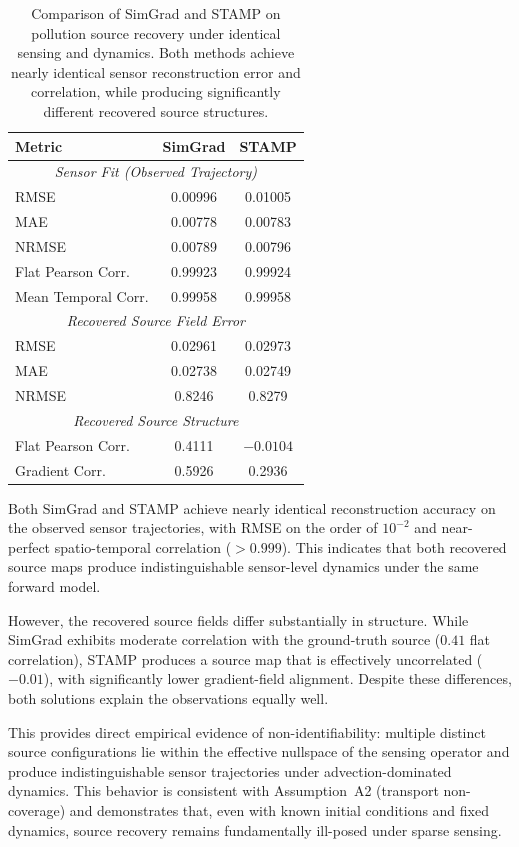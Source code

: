 \begin{table}[t]
\centering
\small
\begin{tabular}{lcc}
\toprule
\textbf{Metric} & \textbf{SimGrad} & \textbf{STAMP} \\
\midrule
\multicolumn{3}{c}{\textit{Sensor Fit (Observed Trajectory)}} \\
RMSE & 0.00996 & 0.01005 \\
MAE  & 0.00778 & 0.00783 \\
NRMSE & 0.00789 & 0.00796 \\
Flat Pearson Corr. & 0.99923 & 0.99924 \\
Mean Temporal Corr. & 0.99958 & 0.99958 \\
\midrule
\multicolumn{3}{c}{\textit{Recovered Source Field Error}} \\
RMSE & 0.02961 & 0.02973 \\
MAE  & 0.02738 & 0.02749 \\
NRMSE & 0.8246 & 0.8279 \\
\midrule
\multicolumn{3}{c}{\textit{Recovered Source Structure}} \\
Flat Pearson Corr. & 0.4111 & $-0.0104$ \\
Gradient Corr. & 0.5926 & 0.2936 \\
\bottomrule
\end{tabular}
\caption{
Comparison of SimGrad and STAMP on pollution source recovery under identical sensing and dynamics. 
Both methods achieve nearly identical sensor reconstruction error and correlation, while producing 
significantly different recovered source structures.
}
\label{tab:pol_non_identifiability}
\end{table}

Both SimGrad and STAMP achieve nearly identical reconstruction accuracy on the observed sensor trajectories, with RMSE on the order of $10^{-2}$ and near-perfect spatio-temporal correlation ($>0.999$). This indicates that both recovered source maps produce indistinguishable sensor-level dynamics under the same forward model.

However, the recovered source fields differ substantially in structure. While SimGrad exhibits moderate correlation with the ground-truth source ($0.41$ flat correlation), STAMP produces a source map that is effectively uncorrelated ($-0.01$), with significantly lower gradient-field alignment. Despite these differences, both solutions explain the observations equally well.

This provides direct empirical evidence of non-identifiability: multiple distinct source configurations lie within the effective nullspace of the sensing operator and produce indistinguishable sensor trajectories under advection-dominated dynamics. This behavior is consistent with Assumption~A2 (transport non-coverage) and demonstrates that, even with known initial conditions and fixed dynamics, source recovery remains fundamentally ill-posed under sparse sensing.

